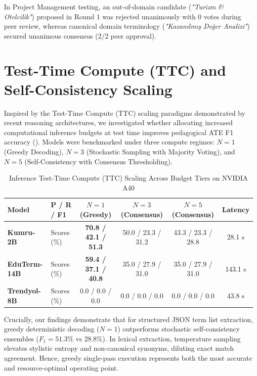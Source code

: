 \documentclass[a4paper,12pt]{report}
\begin{document}
In Project Management testing, an out-of-domain candidate (\textit{"Turizm \& Otelcilik"}) proposed in Round 1 was rejected unanimously with 0 votes during peer review, whereas canonical domain terminology (\textit{"Kazanılmış Değer Analizi"}) secured unanimous consensus ($2/2$ peer approval).


\section{Test-Time Compute (TTC) and Self-Consistency Scaling}
\label{sec:ttc_scaling_benchmark}
Inspired by the Test-Time Compute (TTC) scaling paradigms demonstrated by recent reasoning architectures, we investigated whether allocating increased computational inference budgets at test time improves pedagogical ATE F1 accuracy (). Models were benchmarked under three compute regimes: $N=1$ (Greedy Decoding), $N=3$ (Stochastic Sampling with Majority Voting), and $N=5$ (Self-Consistency with Consensus Thresholding).

\begin{table}[htbp]
\centering
\small
\caption{Inference Test-Time Compute (TTC) Scaling Across Budget Tiers on NVIDIA A40}
\label{tab:ttc_scaling_benchmark}
\scriptsize\setlength{\tabcolsep}{1.5pt}
\begin{tabularx}{\textwidth}{>{\RaggedRight\arraybackslash}Xlcccc}
\hline
\textbf{Model} & \textbf{P / R / F1} & \textbf{$N=1$ (Greedy)} & \textbf{$N=3$ (Consensus)} & \textbf{$N=5$ (Consensus)} & \textbf{Latency} \\
\hline
\textbf{Kumru-2B} & Scores (\%) & \textbf{70.8 / 42.1 / 51.3} & 50.0 / 23.3 / 31.2 & 43.3 / 23.3 / 28.8 & 28.1 s \\
\textbf{EduTerm-14B} & Scores (\%) & \textbf{59.4 / 37.1 / 40.8} & 35.0 / 27.9 / 31.0 & 35.0 / 27.9 / 31.0 & 143.1 s \\
\textbf{Trendyol-8B} & Scores (\%) & 0.0 / 0.0 / 0.0 & 0.0 / 0.0 / 0.0 & 0.0 / 0.0 / 0.0 & 43.8 s \\
\hline
\end{tabularx}
\end{table}

Crucially, our findings demonstrate that for structured JSON term list extraction, greedy deterministic decoding ($N=1$) outperforms stochastic self-consistency ensembles ($F_1 = 51.3\%$ vs $28.8\%$). In lexical extraction, temperature sampling elevates stylistic entropy and non-canonical synonyms, diluting exact match agreement. Hence, greedy single-pass execution represents both the most accurate and resource-optimal operating point.
\end{document}
